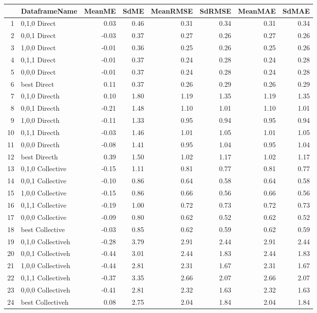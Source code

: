 \begin{table}[ht]
\centering
\begin{tabular}{rlrrrrrr}
  \hline
 & DataframeName & MeanME & SdME & MeanRMSE & SdRMSE & MeanMAE & SdMAE \\ 
  \hline
1 & 0,1,0 Direct & 0.03 & 0.46 & 0.31 & 0.34 & 0.31 & 0.34 \\ 
  2 & 0,0,1 Direct & -0.03 & 0.37 & 0.27 & 0.26 & 0.27 & 0.26 \\ 
  3 & 1,0,0 Direct & -0.01 & 0.36 & 0.25 & 0.26 & 0.25 & 0.26 \\ 
  4 & 0,1,1 Direct & -0.01 & 0.37 & 0.24 & 0.28 & 0.24 & 0.28 \\ 
  5 & 0,0,0 Direct & -0.01 & 0.37 & 0.24 & 0.28 & 0.24 & 0.28 \\ 
  6 & best Direct & 0.11 & 0.37 & 0.26 & 0.29 & 0.26 & 0.29 \\ 
  7 & 0,1,0 Directh & 0.10 & 1.80 & 1.19 & 1.35 & 1.19 & 1.35 \\ 
  8 & 0,0,1 Directh & -0.21 & 1.48 & 1.10 & 1.01 & 1.10 & 1.01 \\ 
  9 & 1,0,0 Directh & -0.11 & 1.33 & 0.95 & 0.94 & 0.95 & 0.94 \\ 
  10 & 0,1,1 Directh & -0.03 & 1.46 & 1.01 & 1.05 & 1.01 & 1.05 \\ 
  11 & 0,0,0 Directh & -0.08 & 1.41 & 0.95 & 1.04 & 0.95 & 1.04 \\ 
  12 & best Directh & 0.39 & 1.50 & 1.02 & 1.17 & 1.02 & 1.17 \\ 
  13 & 0,1,0 Collective & -0.15 & 1.11 & 0.81 & 0.77 & 0.81 & 0.77 \\ 
  14 & 0,0,1 Collective & -0.10 & 0.86 & 0.64 & 0.58 & 0.64 & 0.58 \\ 
  15 & 1,0,0 Collective & -0.15 & 0.86 & 0.66 & 0.56 & 0.66 & 0.56 \\ 
  16 & 0,1,1 Collective & -0.19 & 1.00 & 0.72 & 0.73 & 0.72 & 0.73 \\ 
  17 & 0,0,0 Collective & -0.09 & 0.80 & 0.62 & 0.52 & 0.62 & 0.52 \\ 
  18 & best Collective & -0.03 & 0.85 & 0.62 & 0.59 & 0.62 & 0.59 \\ 
  19 & 0,1,0 Collectiveh & -0.28 & 3.79 & 2.91 & 2.44 & 2.91 & 2.44 \\ 
  20 & 0,0,1 Collectiveh & -0.44 & 3.01 & 2.44 & 1.83 & 2.44 & 1.83 \\ 
  21 & 1,0,0 Collectiveh & -0.44 & 2.81 & 2.31 & 1.67 & 2.31 & 1.67 \\ 
  22 & 0,1,1 Collectiveh & -0.37 & 3.35 & 2.66 & 2.07 & 2.66 & 2.07 \\ 
  23 & 0,0,0 Collectiveh & -0.41 & 2.81 & 2.32 & 1.63 & 2.32 & 1.63 \\ 
  24 & best Collectiveh & 0.08 & 2.75 & 2.04 & 1.84 & 2.04 & 1.84 \\ 
   \hline
\end{tabular}
\end{table}
